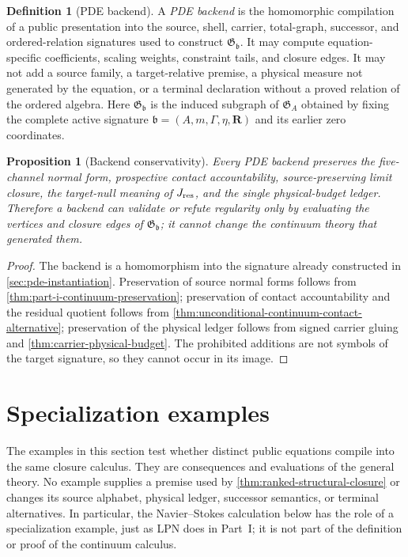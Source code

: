 \documentclass[11pt]{article}
\numberwithin{section}{part}
\theoremstyle{plain}
\newtheorem{proposition}[proposition]{Proposition}
\theoremstyle{definition}
\newtheorem{definition}[definition]{Definition}
\theoremstyle{remark}
\begin{document}
\begin{definition}[PDE backend]
\label{def:pde-backend}
A \emph{PDE backend} is the homomorphic compilation of a public presentation
into the source, shell, carrier, total-graph, successor, and ordered-relation
signatures used to construct \(\mathfrak G_{\mathfrak b}\).  It may compute
equation-specific coefficients, scaling weights, constraint tails, and
closure edges.  It may not add a source family, a target-relative premise, a
physical measure not generated by the equation, or a terminal declaration
without a proved relation of the ordered algebra.
Here \(\mathfrak G_{\mathfrak b}\) is the induced subgraph of
\(\mathfrak G_A\) obtained by fixing the complete active signature
\(\mathfrak b=(A,m,\Gamma,\eta,\mathbf R)\) and its earlier zero coordinates.
\end{definition}

\begin{proposition}[Backend conservativity]
\label{prop:backend-conservativity}
Every PDE backend preserves the five-channel normal form, prospective contact
accountability, source-preserving limit closure, the target-null meaning of
\(J_{\rm res}\), and the single physical-budget ledger.  Therefore a backend
can validate or refute regularity only by evaluating the vertices and closure
edges of \(\mathfrak G_{\mathfrak b}\); it cannot change the continuum theory that
generated them.
\end{proposition}

\begin{proof}
The backend is a homomorphism into the signature already constructed in
\cref{sec:pde-instantiation}.  Preservation of source normal forms follows
from \cref{thm:part-i-continuum-preservation}; preservation of contact
accountability and the residual quotient follows from
\cref{thm:unconditional-continuum-contact-alternative}; preservation of the
physical ledger follows from signed carrier gluing and
\cref{thm:carrier-physical-budget}.  The prohibited additions are not symbols
of the target signature, so they cannot occur in its image.
\end{proof}

\section{Specialization examples}
\label{sec:stress-test-specializations}

The examples in this section test whether distinct public equations compile
into the same closure calculus.  They are consequences and evaluations of
the general theory.  No example supplies a premise used by
\cref{thm:ranked-structural-closure} or changes its source alphabet, physical
ledger, successor semantics, or terminal alternatives.  In particular, the
Navier--Stokes calculation below has the role of a specialization example,
just as LPN does in Part~I; it is not part of the definition or proof of the
continuum calculus.
\end{document}
